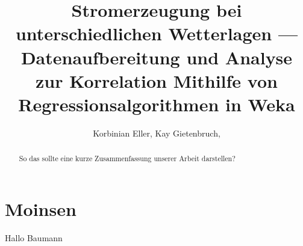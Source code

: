 \documentclass[letterpaper]{article} %
\title{Stromerzeugung bei unterschiedlichen Wetterlagen --- Datenaufbereitung und Analyse zur Korrelation Mithilfe von Regressionsalgorithmen in Weka}
\author {
    Korbinian Eller,
    Kay Gietenbruch,
}
\begin{document}
\maketitle
\begin{abstract}
    So das sollte eine kurze Zusammenfassung unserer Arbeit darstellen?
\end{abstract}
\section*{Moinsen}
Hallo Baumann
\end{document}
